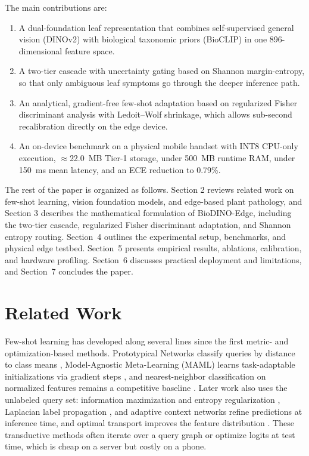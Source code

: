 \documentclass[preprint,12pt]{elsarticle}
\begin{document}
The main contributions are:
\begin{enumerate}
\item A dual-foundation leaf representation that combines self-supervised general vision (DINOv2) with biological taxonomic priors (BioCLIP) in one 896-dimensional feature space.
\item A two-tier cascade with uncertainty gating based on Shannon margin-entropy, so that only ambiguous leaf symptoms go through the deeper inference path.
\item An analytical, gradient-free few-shot adaptation based on regularized Fisher discriminant analysis with Ledoit--Wolf shrinkage, which allows sub-second recalibration directly on the edge device.
\item An on-device benchmark on a physical mobile handset with INT8 CPU-only execution, $\approx$22.0~MB Tier-1 storage, under 500~MB runtime RAM, under 150~ms mean latency, and an ECE reduction to 0.79\%.
\end{enumerate}

The rest of the paper is organized as follows. Section 2 reviews related work on few-shot learning, vision foundation models, and edge-based plant pathology, and Section 3 describes the mathematical formulation of BioDINO-Edge, including the two-tier cascade, regularized Fisher discriminant adaptation, and Shannon entropy routing. Section~4 outlines the experimental setup, benchmarks, and physical edge testbed. Section~5 presents empirical results, ablations, calibration, and hardware profiling. Section~6 discusses practical deployment and limitations, and Section~7 concludes the paper.

\section{Related Work}
\label{sec:related_work}
Few-shot learning has developed along several lines since the first metric- and optimization-based methods. Prototypical Networks classify queries by distance to class means \cite{snell2017prototypical}, Model-Agnostic Meta-Learning (MAML) learns task-adaptable initializations via gradient steps \cite{finn2017maml}, and nearest-neighbor classification on normalized features remains a competitive baseline \cite{wang2019simpleshot}. Later work also uses the unlabeled query set: information maximization and entropy regularization \cite{boudiaf2020transductive}, Laplacian label propagation \cite{ziko2020laplacian}, and adaptive context networks \cite{bateni2020improved} refine predictions at inference time, and optimal transport improves the feature distribution \cite{hu2021leveraging}. These transductive methods often iterate over a query graph or optimize logits at test time, which is cheap on a server but costly on a phone.
\end{document}
